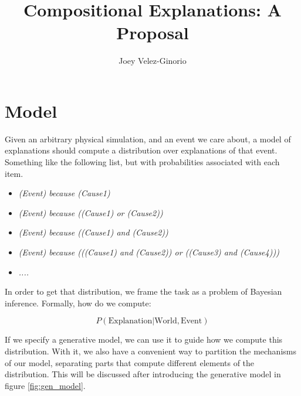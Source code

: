 \documentclass[11pt,a4paper]{article}
\begin{document}
\title{Compositional Explanations: A Proposal}
\author{Joey Velez-Ginorio}
\maketitle

\clearpage 
\tableofcontents
\clearpage 



\section{Model}

Given an arbitrary physical simulation, and an event we care about, a model of explanations should compute a distribution over explanations of that event. Something like the following list, but with probabilities associated with each item.

\begin{itemize}
	\item \textit{(Event) because (Cause1)}
	\item \textit{(Event) because ((Cause1) or (Cause2))}
	\item \textit{(Event) because ((Cause1) and (Cause2))}
	\item \textit{(Event) because (((Cause1) and (Cause2)) or ((Cause3) and (Cause4)))}
	\item \textit{....}
\end{itemize}


In order to get that distribution, we frame the task as a problem of Bayesian inference. Formally, how do we compute:

\begin{equation}
P(\text{Explanation}|\text{World}, \text{Event})  
\end{equation}

If we specify a generative model, we can use it to guide how we compute this distribution. With it, we also have a convenient way to partition the mechanisms of our model, separating parts that compute different elements of the distribution. This will be discussed after introducing the generative model in figure \ref{fig:gen_model}.
\end{document}
